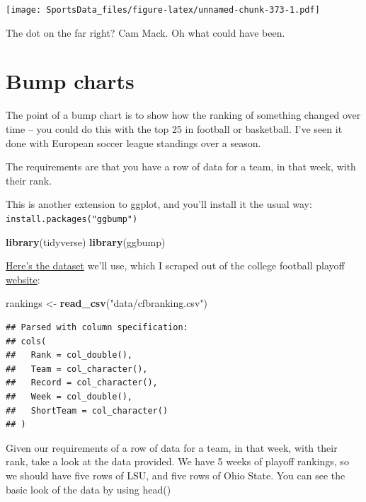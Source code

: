 \documentclass[
]{book}
\newenvironment{Shaded}{\begin{snugshade}}{\end{snugshade}}
\newcommand{\KeywordTok}[1]{\textcolor[rgb]{0.13,0.29,0.53}{\textbf{#1}}}
\newcommand{\NormalTok}[1]{#1}
\newcommand{\StringTok}[1]{\textcolor[rgb]{0.31,0.60,0.02}{#1}}
\begin{document}
\texttt{[image: SportsData\_files/figure-latex/unnamed-chunk-373-1.pdf]}

The dot on the far right? Cam Mack. Oh what could have been.

\hypertarget{bump-charts}{%
\chapter{Bump charts}\label{bump-charts}}

The point of a bump chart is to show how the ranking of something changed over time -- you could do this with the top 25 in football or basketball. I've seen it done with European soccer league standings over a season.

The requirements are that you have a row of data for a team, in that week, with their rank.

This is another extension to ggplot, and you'll install it the usual way: \texttt{install.packages("ggbump")}

\begin{Shaded}
\begin{Highlighting}[]
\KeywordTok{library}\NormalTok{(tidyverse)}
\KeywordTok{library}\NormalTok{(ggbump)}
\end{Highlighting}
\end{Shaded}

\href{https://unl.box.com/s/zgb8hv2fdzz36lcs5bcje59ri84dqjai}{Here's the dataset} we'll use, which I scraped out of the college football playoff \href{https://collegefootballplayoff.com/rankings.aspx}{website}:

\begin{Shaded}
\begin{Highlighting}[]
\NormalTok{rankings <-}\StringTok{ }\KeywordTok{read_csv}\NormalTok{(}\StringTok{"data/cfbranking.csv"}\NormalTok{)}
\end{Highlighting}
\end{Shaded}

\begin{verbatim}
## Parsed with column specification:
## cols(
##   Rank = col_double(),
##   Team = col_character(),
##   Record = col_character(),
##   Week = col_double(),
##   ShortTeam = col_character()
## )
\end{verbatim}

Given our requirements of a row of data for a team, in that week, with their rank, take a look at the data provided. We have 5 weeks of playoff rankings, so we should have five rows of LSU, and five rows of Ohio State. You can see the basic look of the data by using head()
\end{document}
